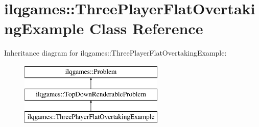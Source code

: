 \hypertarget{classilqgames_1_1_three_player_flat_overtaking_example}{}\section{ilqgames\+:\+:Three\+Player\+Flat\+Overtaking\+Example Class Reference}
\label{classilqgames_1_1_three_player_flat_overtaking_example}
Inheritance diagram for ilqgames\+:\+:Three\+Player\+Flat\+Overtaking\+Example\+:\begin{figure}[H]
\begin{center}
\leavevmode
\includegraphics[height=3.000000cm]{classilqgames_1_1_three_player_flat_overtaking_example}
\end{center}
\end{figure}
